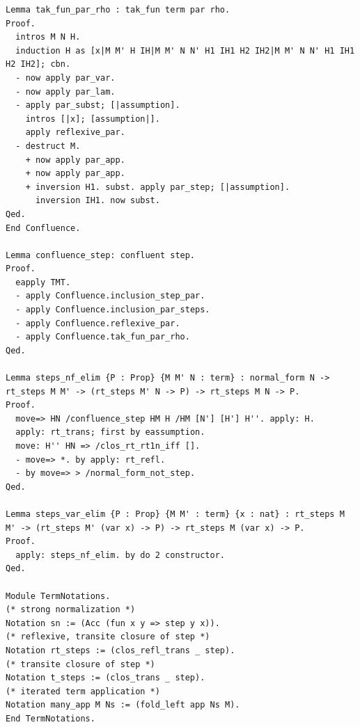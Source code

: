 \documentclass[10pt,a4paper]{amsart}
\begin{document}
\begin{lstlisting}
Lemma tak_fun_par_rho : tak_fun term par rho.
Proof.
  intros M N H.
  induction H as [x|M M' H IH|M M' N N' H1 IH1 H2 IH2|M M' N N' H1 IH1 H2 IH2]; cbn.
  - now apply par_var.
  - now apply par_lam.
  - apply par_subst; [|assumption].
    intros [|x]; [assumption|].
    apply reflexive_par.
  - destruct M.
    + now apply par_app.
    + now apply par_app.
    + inversion H1. subst. apply par_step; [|assumption].
      inversion IH1. now subst.
Qed.
End Confluence.

Lemma confluence_step: confluent step.
Proof.
  eapply TMT.
  - apply Confluence.inclusion_step_par.
  - apply Confluence.inclusion_par_steps.
  - apply Confluence.reflexive_par.
  - apply Confluence.tak_fun_par_rho.
Qed.

Lemma steps_nf_elim {P : Prop} {M M' N : term} : normal_form N -> rt_steps M M' -> (rt_steps M' N -> P) -> rt_steps M N -> P.
Proof.
  move=> HN /confluence_step HM H /HM [N'] [H'] H''. apply: H.
  apply: rt_trans; first by eassumption.
  move: H'' HN => /clos_rt_rt1n_iff [].
  - move=> *. by apply: rt_refl.
  - by move=> > /normal_form_not_step.
Qed.

Lemma steps_var_elim {P : Prop} {M M' : term} {x : nat} : rt_steps M M' -> (rt_steps M' (var x) -> P) -> rt_steps M (var x) -> P.
Proof.
  apply: steps_nf_elim. by do 2 constructor.
Qed.

Module TermNotations.
(* strong normalization *)
Notation sn := (Acc (fun x y => step y x)).
(* reflexive, transite closure of step *)
Notation rt_steps := (clos_refl_trans _ step).
(* transite closure of step *)
Notation t_steps := (clos_trans _ step).
(* iterated term application *)
Notation many_app M Ns := (fold_left app Ns M).
End TermNotations.

\end{lstlisting}
\end{document}
